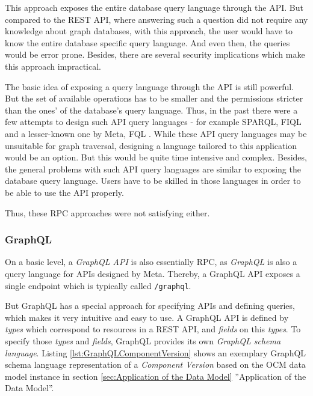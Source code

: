 This approach exposes the entire database query language through the API. But compared to the REST API, where answering such a question did not require any knowledge about graph databases, with this approach, the user would have to know the entire database specific query language. And even then, the queries would be error prone. Besides, there are several security implications which make this approach impractical.\par
The basic idea of exposing a query language through the API is still powerful. But the set of available operations has to be smaller and the permissions stricter than the ones' of the database's query language. Thus, in the past there were a few attempts to design such API query languages - for example SPARQL, FIQL and a lesser-known one by Meta, FQL \cite{APIYouWontHate}. While these API query languages may be unsuitable for graph traversal, designing a language tailored to this application would be an option. But this would be quite time intensive and complex. Besides, the general problems with such API query languages are similar to exposing the database query language. Users have to be skilled in those languages in order to be able to use the API properly.\par
Thus, these RPC approaches were not satisfying either.

\subsubsection{GraphQL}
On a basic level, a \emph{GraphQL API} is also essentially RPC, as \emph{GraphQL} is also a query language for APIs \cite{GraphQL} designed by Meta. Thereby, a GraphQL API exposes a single endpoint which is typically called \lstinline|/graphql|.\par
But GraphQL has a special approach for specifying APIs and defining queries, which makes it very intuitive and easy to use. A GraphQL API is defined by \emph{types} which correspond to resources in a REST API, and \emph{fields} on this \emph{types}. To specify those \emph{types} and \emph{fields}, GraphQL provides its own \emph{GraphQL schema language}. Listing \ref{lst:GraphQLComponentVersion} shows an exemplary GraphQL schema language representation of a \emph{Component Version} based on the OCM data model instance in section \ref{sec:Application of the Data Model} ''Application of the Data Model''.\\

